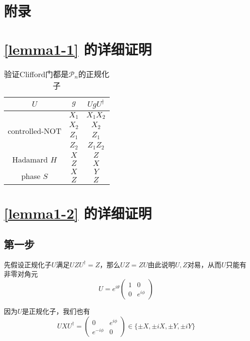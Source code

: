 \documentclass[8pt]{article}
\begin{document}
\newpage



\section*{附录}

\begin{appendices}

\section{\cref{lemma1-1} 的详细证明}

\begin{table}[h]
	\centering
	\begin{tabular}{c|c|c}
		$U$ & $g$ & $UgU^{\dagger}$\\
		\hline 
		\multirow{4}{*}{controlled-NOT} & $X_1$ & $X_1X_2$\\
		& $X_2$ & $X_2$\\
		& $Z_1$ & $Z_1$\\
		& $Z_2$ & $Z_1Z_2$\\
		\hline
		\multirow{2}{*}{Hadamard $H$} & $X$ & $Z$\\
		& $Z$ & $X$\\
		\hline
		\multirow{2}{*}{phase $S$} & $X$ & $Y$\\
		& $Z$ & $Z$\\
	\end{tabular}
	\caption{验证Clifford门都是$\mathcal P_n$的正规化子}
	\label{tab1}
\end{table}
\section{\cref{lemma1-2} 的详细证明}\label{proof1-2}
\subsection{第一步}

先假设正规化子$U$满足$UZU^{\dagger} = Z$，那么$UZ = ZU$由此说明$U, Z$对易，从而$U$只能有非零对角元$$U = e^{i\theta}\begin{pmatrix}
1 & 0\\
0 & e^{i\phi}
\end{pmatrix}$$

因为$U$是正规化子，我们也有$$UXU^{\dagger} = \begin{pmatrix}
0 & e^{i\phi}\\
e^{-i\phi} & 0
\end{pmatrix} \in \{\pm X, \pm iX, \pm Y, \pm iY\}$$


\end{appendices}
\end{document}

